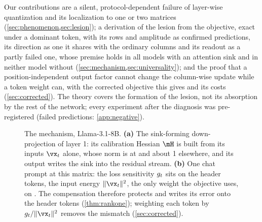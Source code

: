 Our contributions are a silent, protocol-dependent failure of layer-wise quantization and its localization to one or two matrices (\cref{sec:phenomenon,sec:lesion}); a derivation of the lesion from the objective, exact under a dominant token, with its rows and amplitude as confirmed predictions, its direction as one it shares with the ordinary columns and its readout as a partly failed one, whose premise holds in all \nSink{} models with an attention sink and in neither model without (\cref{sec:mechanism,sec:universality}); and the proof that a position-independent output factor cannot change the column-wise update while a token weight can, with the corrected objective this gives and its costs (\cref{sec:corrected}).
The theory covers the formation of the lesion, not its absorption by the rest of the network; every experiment after the diagnosis was pre-registered (failed predictions: \cref{app:negative}).

\begin{figure}[t]
\begin{center}
\end{center}
\caption{The mechanism, Llama-3.1-8B. \textbf{(a)} The sink-forming down-projection of layer 1: its calibration Hessian $\hess$ is built from its inputs $\vx_t$ alone, whose norm is \LbosNorm{} at \bos{} and about 1 elsewhere, and its output writes the sink into the residual stream. \textbf{(b)} One chat prompt at this matrix: the loss sensitivity $g_t$ sits on the header tokens, the input energy $\|\vx_t\|^2$, the only weight the objective uses, on \bos{}. The compensation therefore protects \bos{} and writes its error onto the header tokens (\cref{thm:rankone}); weighting each token by $\gsens/\|\vx_t\|^2$ removes the mismatch (\cref{sec:corrected}).}
\label{fig:teaser}
\end{figure}
